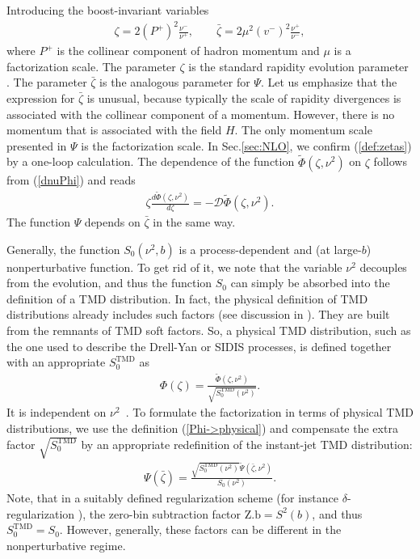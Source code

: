 \documentclass[a4paper, amsfonts, amssymb, amsmath, reprint, showkeys, nofootinbib, twoside]{revtex4-1}
\renewcommand{\(}{\left(}
\renewcommand{\)}{\right)}
\renewcommand{\[}{\left[}
\renewcommand{\]}{\right]}
\begin{document}
Introducing the boost-invariant variables
\begin{eqnarray}\label{def:zetas}
\zeta=2(P^+)^2\frac{\nu^-}{\nu^+},\qquad \bar \zeta=2\mu^2(v^-)^2\frac{\nu^+}{\nu^-},
\end{eqnarray}
where $P^+$ is the collinear component of hadron momentum and $\mu$ is a factorization scale. The parameter $\zeta$ is the standard rapidity evolution parameter \cite{GarciaEchevarria:2011rb,Vladimirov:2017ksc,Collins:2011zzd}. The parameter $\bar\zeta$ is the analogous parameter for $\Psi$. Let us emphasize that the expression for $\bar \zeta$ is unusual, because typically the scale of rapidity divergences is associated with the collinear component of a momentum. However, there is no momentum that is associated with the field $H$. The only momentum scale presented in $\Psi$ is the factorization scale. In Sec.\ref{sec:NLO}, we confirm (\ref{def:zetas}) by a one-loop calculation. The dependence of the function $\widetilde{\Phi}(\zeta,\nu^2)$ on $\zeta$ follows from (\ref{dnuPhi}) and reads
\begin{eqnarray}
\zeta\frac{d \widetilde{\Phi}(\zeta,\nu^2)}{d\zeta}=-\mathcal{D}\widetilde{\Phi}(\zeta,\nu^2).
\end{eqnarray}
The function $\Psi$ depends on $\bar \zeta$ in the same way.

Generally, the function $S_0(\nu^2,b)$ is a process-dependent and (at large-$b$) nonperturbative function. To get rid of it, we note that the variable $\nu^2$ decouples from the evolution, and thus the function $S_0$ can simply be absorbed into the definition of a TMD distribution.
In fact, the physical definition of TMD distributions already includes such factors (see discussion in \cite{Vladimirov:2017ksc,Collins:2011zzd}). They are built from the remnants of TMD soft factors. So, a physical TMD distribution, such as the one used to describe the Drell-Yan or SIDIS processes, is defined together with an appropriate $S_0^{\text{TMD}}$  as
\begin{eqnarray}\label{Phi->physical}
\Phi(\zeta)=\frac{\widetilde{\Phi}(\zeta,\nu^2)}{\sqrt{S_0^{\text{TMD}}(\nu^2)}}.
\end{eqnarray}
It is independent on $\nu^2$~\cite{Vladimirov:2017ksc}. To formulate the factorization in terms of physical TMD distributions, we use the definition (\ref{Phi->physical}) and compensate the extra factor $\sqrt{S^{\text{TMD}}_0}$ by an appropriate redefinition of the instant-jet TMD distribution:
\begin{eqnarray}\label{Psi->physical}
\Psi(\bar\zeta)=\frac{\sqrt{S_0^{\text{TMD}}(\nu^2)}\widetilde{\Psi}(\bar\zeta,\nu^2)}{S_0(\nu^2)}.
\end{eqnarray}
Note, that in a suitably defined regularization scheme (for instance $\delta$-regularization \cite{GarciaEchevarria:2011rb}), the zero-bin subtraction factor $\text{Z.b}=S^2(b)$, and thus $S_0^{\text{TMD}}=S_0$. However, generally, these factors can be different in the nonperturbative regime.
\end{document}
